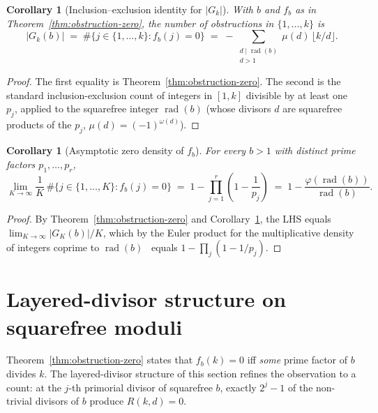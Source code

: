 \documentclass[11pt,reqno]{amsart}
\theoremstyle{plain}
\newtheorem{corollary}[theorem]{Corollary}
\theoremstyle{definition}
\theoremstyle{remark}
\DeclareMathOperator{\rad}{rad}
\begin{document}
\begin{corollary}[Inclusion--exclusion identity for $|G_{k}|$]\label{cor:incl-excl}
With $b$ and $f_{b}$ as in Theorem~\ref{thm:obstruction-zero}, the
number of obstructions in $\{1, \dots, k\}$ is
\[
  |G_{k}(b)|
  \;=\; \#\{j \in \{1, \dots, k\} : f_{b}(j) = 0\}
  \;=\; -\sum_{\substack{d \mid \rad(b)\\ d > 1}}
              \mu(d)\,\lfloor k/d \rfloor.
\]
\end{corollary}

\begin{proof}
The first equality is Theorem~\ref{thm:obstruction-zero}. The second
is the standard inclusion-exclusion count of integers in $[1, k]$
divisible by at least one $p_{j}$, applied to the squarefree integer
$\rad(b)$ (whose divisors $d$ are squarefree products of the $p_{j}$,
$\mu(d) = (-1)^{\omega(d)}$).
\end{proof}

\begin{corollary}[Asymptotic zero density of $f_{b}$]\label{cor:asymp-density}
For every $b > 1$ with distinct prime factors $p_{1}, \dots, p_{r}$,
\begin{equation}\label{eq:asymp-density}
  \lim_{K \to \infty}
  \frac{1}{K}\,\#\{j \in \{1, \dots, K\} : f_{b}(j) = 0\}
  \;=\; 1 - \prod_{j=1}^{r}\!\left(1 - \frac{1}{p_{j}}\right)
  \;=\; 1 - \frac{\varphi(\rad(b))}{\rad(b)}.
\end{equation}
\end{corollary}

\begin{proof}
By Theorem~\ref{thm:obstruction-zero} and Corollary~\ref{cor:incl-excl},
the LHS equals $\lim_{K \to \infty} |G_{K}(b)|/K$, which by the Euler
product for the multiplicative density of integers coprime to
$\rad(b)$~\cite{HardyWright2008,Apostol1976} equals
$1 - \prod_{j}(1 - 1/p_{j})$.
\end{proof}

\section{Layered-divisor structure on squarefree moduli}\label{sec:layered}

Theorem~\ref{thm:obstruction-zero} states that $f_{b}(k) = 0$ iff
\emph{some} prime factor of $b$ divides $k$. The layered-divisor
structure of this section refines the observation to a count: at the
$j$-th primorial divisor of squarefree $b$, exactly $2^{j} - 1$ of the
non-trivial divisors of $b$ produce $R(k, d) = 0$.
\end{document}
